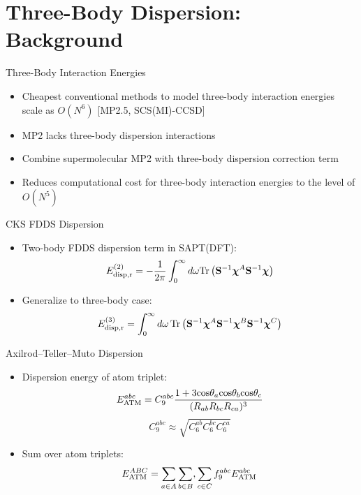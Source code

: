 \documentclass{beamer}
\begin{document}
\section{Three-Body Dispersion: Background}

    \begin{frame}{Three-Body Interaction Energies}
        \begin{itemize}
            \item Cheapest conventional methods to model three-body interaction energies scale as $O(N^6)$ [MP2.5, SCS(MI)-CCSD]
            \item MP2 lacks three-body dispersion interactions
            \item Combine supermolecular MP2 with three-body dispersion correction term 
            \item Reduces computational cost for three-body interaction energies to the level of $O(N^5)$
        \end{itemize}
    \end{frame}

    \begin{frame}{CKS FDDS Dispersion}
        \begin{itemize}
            \item Two-body FDDS dispersion term in SAPT(DFT):
            $$E_{\rm{disp,r}}^{(2)} =  -\frac{1}{2\pi}\int_0^\infty d\omega \mathrm{Tr}\left(\mathbf{S}^{-1}\boldsymbol{\chi}^A\mathbf{S}^{-1}\boldsymbol{\chi}\right)$$
            \item Generalize to three-body case:
            $$E_{\rm{disp,r}}^{(3)} = \int_0^\infty d\omega\,\mathrm{Tr}\left(\mathbf{S}^{-1}\boldsymbol{\chi}^A\mathbf{S}^{-1}\boldsymbol{\chi}^B\mathbf{S}^{-1}\boldsymbol{\chi}^C\right)$$
        \end{itemize}
    \end{frame}

    \begin{frame}{Axilrod--Teller--Muto Dispersion}
        \begin{itemize}
            \item Dispersion energy of atom triplet:
            $$E_{\rm{ATM}}^{abc} = C_9^{abc} \frac{1 + 3{\rm{cos}} \theta_a {\rm{cos}} \theta_b {\rm{cos}} \theta_c}{(R_{ab}R_{bc}R_{ca})^3}$$
            $$C_9^{abc} \approx \sqrt{C_6^{ab} C_6^{bc} C_6^{ca}}$$
            \item Sum over atom triplets:
            $$E_{\rm{ATM}}^{ABC} = \sum_{a \in A} \sum_{b \in B}, \sum_{c \in C} f^{abc}_9 E_{\rm{ATM}}^{abc}$$
        \end{itemize}
    \end{frame}
\end{document}
